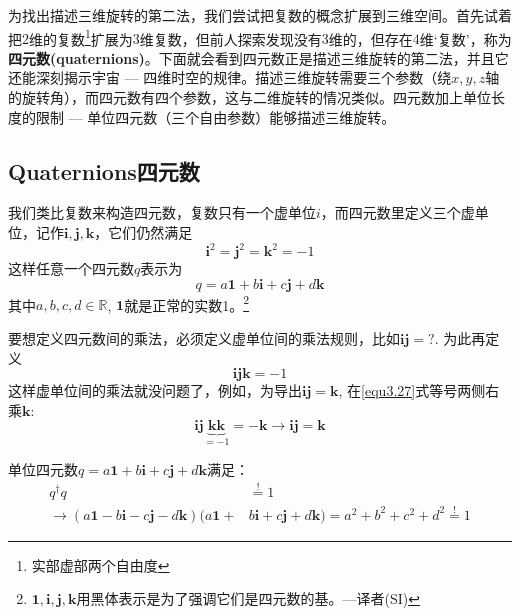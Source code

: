 为找出描述三维旋转的第二法，我们尝试把复数的概念扩展到三维空间。首先试着把$2$维的复数\footnote{实部虚部两个自由度}扩展为$3$维复数，但前人探索发现没有$3$维的，但存在$4$维‘复数’，称为{\bf 四元数(quaternions)}。下面就会看到四元数正是描述三维旋转的第二法，并且它还能深刻揭示宇宙 --- 四维时空的规律。描述三维旋转需要三个参数（绕$x,y,z$轴的旋转角），而四元数有四个参数，这与二维旋转的情况类似。四元数加上单位长度的限制 --- 单位四元数（三个自由参数）能够描述三维旋转。

\subsection[四元数]{Quaternions\quad 四元数}
\label{sec3.3.1}
我们类比复数来构造四元数，复数只有一个虚单位$i$，而四元数里定义三个虚单位，记作$\mathbf{i,j,k}$，它们仍然满足
\begin{equation}
\label{equ3.25}
\mathbf{i}^2 = \mathbf{j}^2 = \mathbf{k}^2 = -1
\end{equation}
这样任意一个四元数$q$表示为
\begin{equation}
\label{equ3.26}
q = a\mathbf{1} + b\mathbf{i} + c\mathbf{j} + d\mathbf{k}
\end{equation}
其中$a, b, c, d \in \mathbb{R}$, $\mathbf{1}$就是正常的实数1。\footnote{$\mathbf{1,i,j,k}$用黑体表示是为了强调它们是四元数的基。---译者(SI)}

要想定义四元数间的乘法，必须定义虚单位间的乘法规则，比如$\mathbf{ij} = ?$. 为此再定义
\begin{equation}
\label{equ3.27}
\mathbf{ijk} = -1
\end{equation}
这样虚单位间的乘法就没问题了，例如，为导出$\mathbf{ij} = \mathbf{k}$, 在\ref{equ3.27}式等号两侧右乘$\mathbf{k}$:
\begin{equation}
\label{equ3.28}
\mathbf{ij} \underbrace{\mathbf{kk}}_{= -1} = -\mathbf{k} \rightarrow \mathbf{ij} = \mathbf{k}
\end{equation}

单位四元数$q = a\mathbf{1} + b\mathbf{i} + c\mathbf{j} + d\mathbf{k}$满足：
\begin{align}
q^\dag q &\stackrel{!}{=} 1 \nonumber\\
\label{equ3.29}
\rightarrow (a\mathbf{1} - b\mathbf{i} - c\mathbf{j} - d\mathbf{k}) (a\mathbf{1} +& b\mathbf{i} + c\mathbf{j} + d\mathbf{k}) = a^2 + b^2 + c^2 + d^2 \stackrel{!}{=} 1
\end{align}

